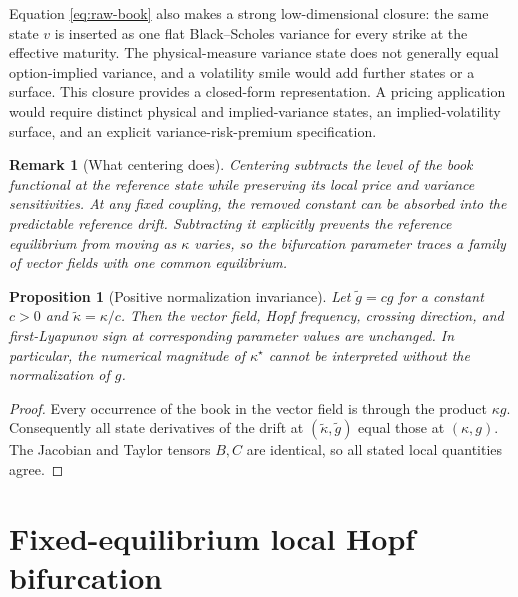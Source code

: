 \documentclass[11pt]{article}
\newtheorem{proposition}{Proposition}
\newtheorem{remark}{Remark}
\begin{document}
Equation \eqref{eq:raw-book} also makes a strong low-dimensional closure: the same state
$v$ is inserted as one flat Black--Scholes variance for every strike at the effective
maturity.  The physical-measure variance state does not generally equal option-implied
variance, and a volatility smile would add further states or a surface.  This closure
provides a closed-form representation.  A pricing application would require distinct physical and
implied-variance states, an implied-volatility surface, and an explicit variance-risk-premium
specification.

\begin{remark}[What centering does]
Centering subtracts the level of the book functional at the reference state while preserving
its local price and variance sensitivities.  At any fixed coupling, the removed constant can
be absorbed into the predictable reference drift.  Subtracting it explicitly prevents the
reference equilibrium from moving as $\kappa$ varies, so the bifurcation parameter traces a
family of vector fields with one common equilibrium.
\end{remark}

\begin{proposition}[Positive normalization invariance]
\label{prop:normalization}
Let $\widetilde g=cg$ for a constant $c>0$ and
$\widetilde\kappa=\kappa/c$.  Then the vector field, Hopf frequency, crossing direction,
and first-Lyapunov sign at corresponding parameter values are unchanged.  In particular,
the numerical magnitude of $\kappa^\star$ cannot be interpreted without the normalization
of $g$.
\end{proposition}

\begin{proof}
Every occurrence of the book in the vector field is through the product $\kappa g$.
Consequently all state derivatives of the drift at
$(\widetilde\kappa,\widetilde g)$ equal those at $(\kappa,g)$.  The Jacobian and Taylor
tensors $B,C$ are identical, so all stated local quantities agree.
\end{proof}

\section{Fixed-equilibrium local Hopf bifurcation}
\label{sec:hopf}
\end{document}
